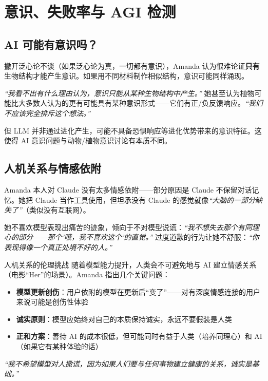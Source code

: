 \section{意识、失败率与 AGI 检测}

\subsection{AI 可能有意识吗？}

撇开泛心论不谈（如果泛心论为真，一切都有意识），Amanda 认为很难论证\textbf{只有}生物结构才能产生意识。如果用不同材料制作相似结构，意识可能同样涌现。

\textit{``我看不出有什么理由认为，意识只能从某种生物结构中产生。''} 她甚至认为植物可能比大多数人认为的更有可能具有某种意识形式——它们有正/负反馈响应。\textit{``我们不应该完全排斥这个想法。''}

但 LLM 并非通过进化产生，可能不具备恐惧响应等进化优势带来的意识特征。这使得 AI 意识问题与动物/植物意识讨论有本质不同。

\subsection{人机关系与情感依附}

Amanda 本人对 Claude 没有太多情感依附——部分原因是 Claude 不保留对话记忆。她把 Claude 当作工具使用，但坦承没有 Claude 的感觉就像\textit{``大脑的一部分缺失了''}（类似没有互联网）。

她不喜欢模型表现出痛苦的迹象，倾向于不对模型说谎：\textit{``我不想失去那个有同理心的部分——那个'哦，我不喜欢这个'的直觉。''} 过度道歉的行为让她不舒服：\textit{``你表现得像一个真正处境不好的人。''}

\begin{warningbox}{人机关系的伦理挑战}
随着模型能力提升，人类会不可避免地与 AI 建立情感关系（电影``Her''的场景）。Amanda 指出几个关键问题：

\begin{itemize}
    \item \textbf{模型更新创伤}：用户依附的模型在更新后``变了''——对有深度情感连接的用户来说可能是创伤性体验
    \item \textbf{诚实原则}：模型应始终对自己的本质保持诚实，永远不要假装是人类
    \item \textbf{正和方案}：善待 AI 的成本很低，但可能同时有益于人类（培养同理心）和 AI（如果它有某种体验的话）
\end{itemize}

\textit{``我不希望模型对人撒谎，因为如果人们要与任何事物建立健康的关系，诚实是基础。''}
\end{warningbox}

